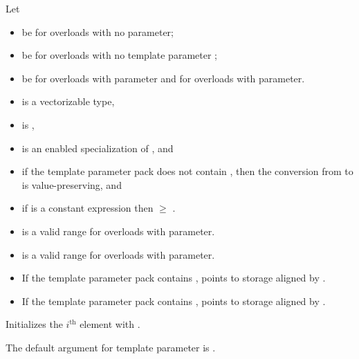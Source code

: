 \begin{itemdescr}
  \pnum
  Let
  \begin{itemize}
    \item {} be  for overloads with no  parameter;
    \item {} be  for overloads with no template parameter
      ;
    \item {} be  for overloads with  parameter and
       for overloads with  parameter.
  \end{itemize}

  \pnum\mandates
  \begin{itemize}
    \item {} is a vectorizable type,
    \item {} is ,
    \item {} is an enabled specialization of , and
    \item if the template parameter pack  does not contain \tcode{\convertflag}, then
      the conversion from  to  is
      value-preserving, and
    \item if  is a constant expression then  $\ge$
      .
  \end{itemize}

  \pnum\expects
  \begin{itemize}
    \item {} is a valid range for overloads with  parameter.
    \item {} is a valid range for overloads with  parameter.
    \item If the template parameter pack  contains \tcode{\alignedflag},
       points to storage aligned by .
    \item If the template parameter pack  contains ,
       points to storage aligned by .
  \end{itemize}

  \pnum\effects
  Initializes the $i^\text{th}$ element with  \foralli[V::].

  \pnum\remarks
  The default argument for template parameter  is
  .
\end{itemdescr}

